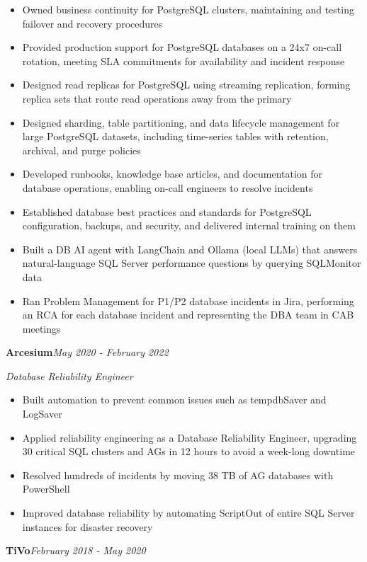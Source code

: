 \documentclass[10pt,a4paper]{article}
\begin{document}
\begin{itemize}
  \item Owned business continuity for PostgreSQL clusters, maintaining and testing failover and recovery procedures
  \item Provided production support for PostgreSQL databases on a 24x7 on-call rotation, meeting SLA commitments for availability and incident response
  \item Designed read replicas for PostgreSQL using streaming replication, forming replica sets that route read operations away from the primary
  \item Designed sharding, table partitioning, and data lifecycle management for large PostgreSQL datasets, including time-series tables with retention, archival, and purge policies
  \item Developed runbooks, knowledge base articles, and documentation for database operations, enabling on-call engineers to resolve incidents
  \item Established database best practices and standards for PostgreSQL configuration, backups, and security, and delivered internal training on them
  \item Built a DB AI agent with LangChain and Ollama (local LLMs) that answers natural-language SQL Server performance questions by querying SQLMonitor data
  \item Ran Problem Management for P1/P2 database incidents in Jira, performing an RCA for each database incident and representing the DBA team in CAB meetings
\end{itemize}
\vspace{14.7pt}
\noindent\textbf{Arcesium}\hfill \textit{May 2020 - February 2022}

\textit{Database Reliability Engineer}\\[-5pt]
\begin{itemize}
  \item Built automation to prevent common issues such as tempdbSaver and LogSaver
  \item Applied reliability engineering as a Database Reliability Engineer, upgrading 30 critical SQL clusters and AGs in 12 hours to avoid a week-long downtime
  \item Resolved hundreds of incidents by moving 38 TB of AG databases with PowerShell
  \item Improved database reliability by automating ScriptOut of entire SQL Server instances for disaster recovery
\end{itemize}
\vspace{14.7pt}
\noindent\textbf{TiVo}\hfill \textit{February 2018 - May 2020}
\end{document}
